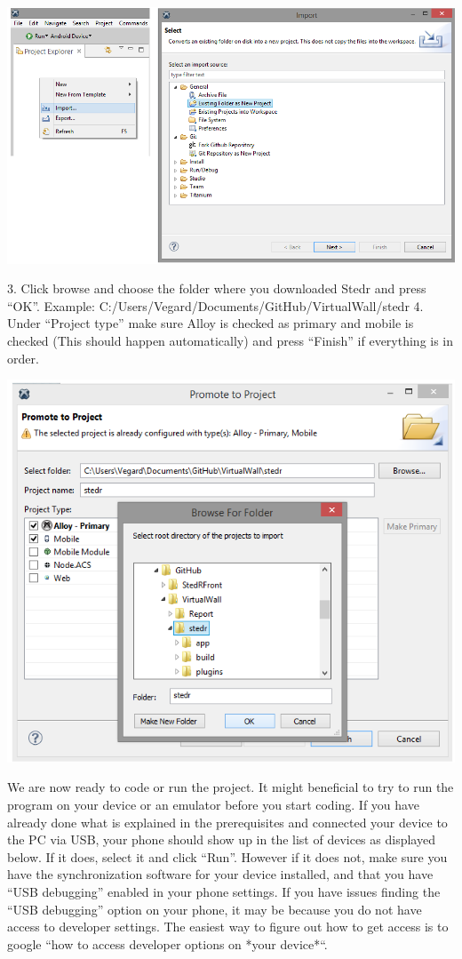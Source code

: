 \begin{center}
\includegraphics[scale=0.45]{guide/f2.png} 
\end{center}

3. Click browse and choose the folder where you downloaded Stedr and press “OK”. 
Example: C:/Users/Vegard/Documents/GitHub/VirtualWall/stedr
4. Under “Project type” make sure Alloy is checked as primary and mobile is checked (This should happen automatically) and press “Finish” if everything is in order.

\begin{center}
\includegraphics[scale=0.45]{guide/f3.png} 
\end{center}

We are now ready to code or run the project. It might beneficial to try to run the program on your device or an emulator before you start coding. If you have already done what is explained in the prerequisites and connected your device to the PC via USB, your phone should show up in the list of devices as displayed below. If it does, select it and click “Run”. However if it does not, make sure you have the synchronization software for your device installed, and that you have “USB debugging” enabled in your phone settings. If you have issues finding the “USB debugging” option on your phone, it may be because you do not have access to developer settings. The easiest way to figure out how to get access is to google “how to access developer options on *your device*“.

